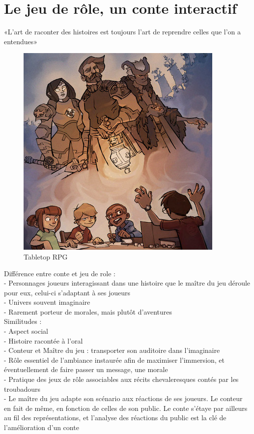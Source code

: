 \section{Le jeu de rôle, un conte interactif}

«L'art de raconter des histoires est toujours l'art de reprendre celles que l'on a entendues»\\

\begin{figure}[h!]
    \centering
    \includegraphics[width=0.80\linewidth]{img/rpg_tabletop2.jpg}
    \caption{Tabletop RPG}
\end{figure}

Différence entre conte et jeu de role : \\
- Personnages joueurs interagissant dans une histoire que le maître du jeu déroule pour eux, celui-ci s'adaptant à ses joueurs\\
- Univers souvent imaginaire\\
- Rarement porteur de morales, mais plutôt d'aventures\\


Similitudes :\\
- Aspect social\\
- Histoire racontée à l'oral\\
- Conteur et Maître du jeu : transporter son auditoire dans l'imaginaire\\
- Rôle essentiel de l'ambiance instaurée afin de maximiser l'immersion, et éventuellement de faire passer un message, une morale\\
- Pratique des jeux de rôle associables aux récits chevaleresques contés par les troubadours\\
- Le maître du jeu adapte son scénario aux réactions de ses joueurs. Le conteur en fait de même, en fonction de celles de son public. Le conte s'étaye par ailleurs au fil des représentations, et l'analyse des réactions du public est la clé de l'amélioration d'un conte\\

